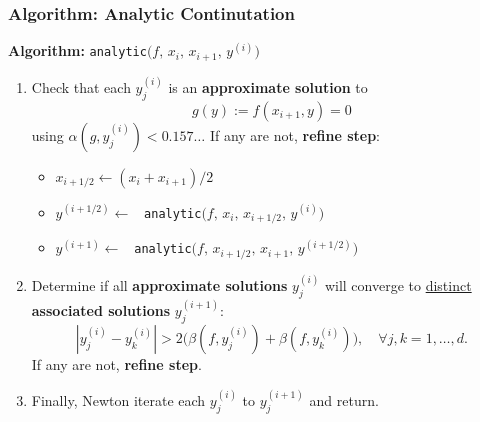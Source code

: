 \documentclass{beamer}
\begin{document}
\begin{frame}
  \frametitle{Algorithm: Analytic Continutation}

  {\bf Algorithm:} {\tt analytic}$\big(f,\, x_i,\, x_{i+1},\,
  y^{(i)}\big)$ \\

  {\small

  \begin{enumerate}
  \item<1-> Check that each $y_j^{(i)}$ is an {\bf approximate solution} to
    \[
    g(y) := f(x_{i+1},y) = 0
    \]
    using $\alpha(g,y_j^{(i)}) < 0.157\ldots$ If any are not, {\bf refine step}:
    \begin{itemize}
    \item<2-> $x_{i+1/2} \gets (x_i + x_{i+1}) / 2$
    \item<3-> $y^{(i+1/2)} \gets$ {\tt
      analytic}$\big(f,\, x_i, \, x_{i+1/2},\, y^{(i)}\big)$
    \item<4-> $y^{(i+1)} \gets$ {\tt
      analytic}$\big(f,\, x_{i+1/2},\, x_{i+1},\, y^{(i+1/2)}\big)$
    \end{itemize}
  \item<5-> Determine if all {\bf approximate solutions} $y_j^{(i)}$ will
    converge to \underline{distinct} {\bf associated solutions} $y_j^{(i+1)}$:
    \[
    |y_j^{(i)} - y_k^{(i)}| > 2 \big( \beta(f,y_j^{(i)}) +
    \beta(f,y_k^{(i)}) \big), \quad \forall j,k = 1, \ldots, d.
    \]
    If any are not, {\bf refine step}.
  \item<6-> Finally, Newton iterate each $y_j^{(i)}$ to $y_j^{(i+1)}$
    and return.
  \end{enumerate}
  }
\end{frame}
\end{document}
